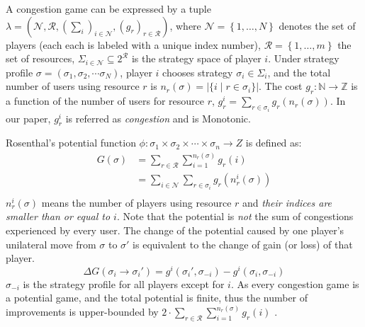 A congestion game \cite{Rosenthal}\cite{Voecking06congestiongames} can be expressed by a tuple $\lambda=(\mathcal{N},\mathcal{R},(\sum_i)_{i \in \mathcal{N}},(g_r)_{r\in \mathcal{R}})$, where $\mathcal{N}=\left\{1,\ldots,N\right\}$ denotes the set of players (each each is labeled with a unique index number), $\mathcal{R}=\left\{1,\ldots,m\right\}$ the set of resources, $\Sigma_{i\in\mathcal{N}} \subseteq 2^{\mathcal{R}}$ is the strategy space of player $i$. 
Under strategy profile $\sigma=(\sigma_1,\sigma_2,\cdots \sigma_N)$, player $i$ chooses strategy $\sigma_i\in \Sigma_i$, and the total number of users using resource $r$ is $n_r(\sigma)=|\{i\mid r\in \sigma_i\}|$. 
The cost $g_r: \mathbb{N}\rightarrow \mathbb{Z}$ is a function of the number of users for resource $r$, $g_r^i=\sum_{r\in \sigma_i} g_r(n_r(\sigma))$. 
In our paper, $g_r^i$ is referred as \textit{congestion} and is Monotonic.

Rosenthal's potential function $\phi:\sigma_1\times\sigma_2\times\cdots\times\sigma_n\rightarrow Z$ is defined as:
\begin{equation}
\label{4}
\begin{split}
G(\sigma) 
& =\sum\limits^{}_{r\in \mathcal{R}} \sum\limits^{n_r(\sigma)}_{i=1} g_r(i)\\
& =\sum\limits_{i\in \mathcal{N}} \sum\limits^{}_{r\in \sigma_i} g_r(n_r^i(\sigma))\\
\end{split}
\end{equation}
$n_r^i(\sigma)$ means the number of players using resource $r$ and \textit{their indices are smaller than or equal to $i$}. 
Note that the potential is \textit{not} the sum of congestions experienced by every user. 
The change of the potential caused by one player's unilateral move from $\sigma$ to $\sigma'$ is equivalent to the change of gain (or loss) of that player.
\begin{equation}
\label{5}
\varDelta G(\sigma_i \rightarrow \sigma_i') = g^i(\sigma_i',\sigma_{-i}) - g^i(\sigma_i,\sigma_{-i})
\end{equation}
$\sigma_{-i}$ is the strategy profile for all players except for $i$.
As every congestion game is a potential game, and the total potential is finite, thus the number of improvements is upper-bounded by $2\cdot\sum\limits^{}_{r\in \mathcal{R}} \sum\limits^{n_r(\sigma)}_{i=1} g_r(i)$ \cite{Voecking06congestiongames}.




